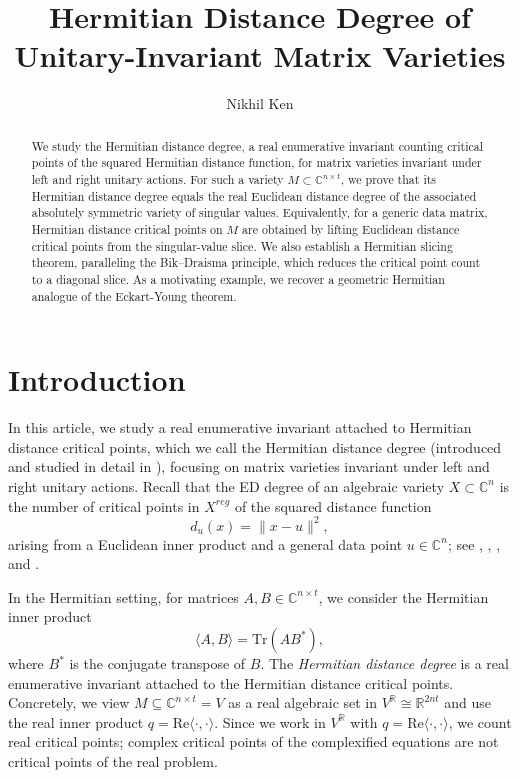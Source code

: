 \documentclass[11pt]{amsart}
\def\R{\mathbb R}\let\er\R
\def\C{\mathbb C}\let\ce\C
\theoremstyle{plain}
\theoremstyle{definition}
\theoremstyle{remark}
\begin{document}
\title{Hermitian Distance Degree of Unitary-Invariant Matrix Varieties}
\author{Nikhil Ken}



\begin{abstract}
We study the Hermitian distance degree, a real enumerative invariant counting critical points of the squared Hermitian distance function, for matrix varieties invariant under left and right unitary actions. For such a variety \(M \subset \mathbb{C}^{n\times t}\), we prove that its Hermitian distance degree equals the real Euclidean distance degree of the associated absolutely symmetric variety of singular values. Equivalently, for a generic data matrix, Hermitian distance critical points on \(M\) are obtained by lifting Euclidean distance critical points from the singular-value slice. We also establish a Hermitian slicing theorem, paralleling the Bik--Draisma principle, which reduces the critical point count to a diagonal slice. As a motivating example, we recover a geometric Hermitian analogue of the Eckart-Young theorem.
\end{abstract}

\maketitle

\section{Introduction}
In this article, 
we study a real enumerative invariant attached to Hermitian distance critical points,
which we call the Hermitian distance degree (introduced and studied in detail in \cite{Furchi2025_HermitianDistanceDegree}),
focusing on matrix varieties invariant under left and right unitary actions. Recall that the ED degree of an algebraic variety
$X \subset \mathbb{C}^n$ is the number of critical points in $X^{reg}$ of the squared distance function
\[
d_u(x) = \|x - u\|^2,
\]
arising from a Euclidean inner product and a general data point $u \in \mathbb{C}^n$; see \cite{draisma2016euclidean}, \cite{drusvyatskiy2017euclidean}, \cite{HorobetWeinstein2019_OffsetPersistentHomology}, \cite{Sodomaco2021_ProductSingularValues} and \cite{baaijens2015euclidean}.

In the Hermitian setting, for matrices $A,B \in \mathbb{C}^{n \times t}$, we consider the Hermitian inner product
\[
\langle A,B \rangle = \mathrm{Tr}(A B^*),
\]
where $B^*$ is the conjugate transpose of $B$. The \emph{Hermitian distance degree} is a real enumerative invariant attached to the Hermitian
distance critical points.  Concretely, we view $M\subseteq\C^{n\times t}=V$ as a real algebraic set
in $V^{\R}\cong\R^{2nt}$ and use the real inner product $q=\mathrm{Re}\langle\cdot,\cdot\rangle$. Since we work in $V^{\mathbb R}$ with $q=\mathrm{Re}\langle\cdot,\cdot\rangle$, we count real critical points; complex critical points of the complexified equations are not critical points of the real problem.
\end{document}
